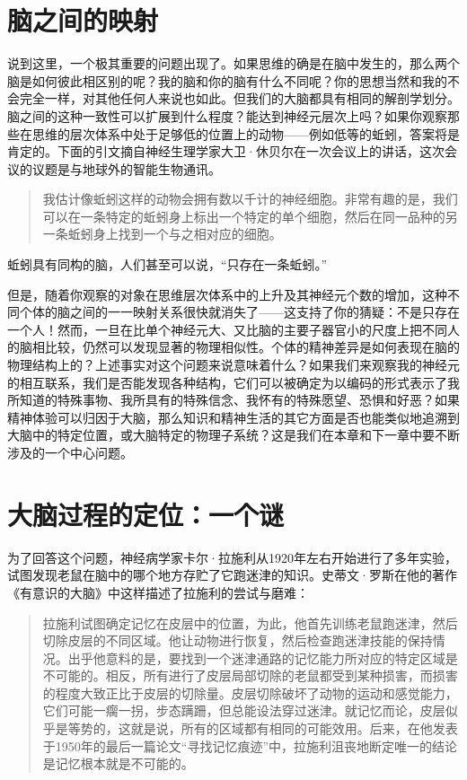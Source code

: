 \section{脑之间的映射}

说到这里，一个极其重要的问题出现了。如果思维的确是在脑中发生的，那么两个脑是如何彼此相区别的呢？我的脑和你的脑有什么不同呢？你的思想当然和我的不会完全一样，对其他任何人来说也如此。但我们的大脑都具有相同的解剖学划分。脑之间的这种一致性可以扩展到什么程度？能达到神经元层次上吗？如果你观察那些在思维的层次体系中处于足够低的位置上的动物——例如低等的蚯蚓，答案将是肯定的。下面的引文摘自神经生理学家大卫·休贝尔在一次会议上的讲话，这次会议的议题是与地球外的智能生物通讯。

\begin{quote}
我估计像蚯蚓这样的动物会拥有数以千计的神经细胞。非常有趣的是，我们可以在一条特定的蚯蚓身上标出一个特定的单个细胞，然后在同一品种的另一条蚯蚓身上找到一个与之相对应的细胞。
\end{quote}
蚯蚓具有同构的脑，人们甚至可以说，“只存在一条蚯蚓。”

但是，随着你观察的对象在思维层次体系中的上升及其神经元个数的增加，这种不同个体的脑之间的一一映射关系很快就消失了——这支持了你的猜疑：不是只存在一个人！然而，一旦在比单个神经元大、又比脑的主要子器官小的尺度上把不同人的脑相比较，仍然可以发现显著的物理相似性。个体的精神差异是如何表现在脑的物理结构上的？上述事实对这个问题来说意味着什么？如果我们来观察我的神经元的相互联系，我们是否能发现各种结构，它们可以被确定为以编码的形式表示了我所知道的特殊事物、我所具有的特殊信念、我怀有的特殊愿望、恐惧和好恶？如果精神体验可以归因于大脑，那么知识和精神生活的其它方面是否也能类似地追溯到大脑中的特定位置，或大脑特定的物理子系统？这是我们在本章和下一章中要不断涉及的一个中心问题。

\section{大脑过程的定位：一个谜}

为了回答这个问题，神经病学家卡尔·拉施利从1920年左右开始进行了多年实验，试图发现老鼠在脑中的哪个地方存贮了它跑迷津的知识。史蒂文·罗斯在他的著作《有意识的大脑》中这样描述了拉施利的尝试与磨难：

\begin{quote}
拉施利试图确定记忆在皮层中的位置，为此，他首先训练老鼠跑迷津，然后切除皮层的不同区域。他让动物进行恢复，然后检查跑迷津技能的保持情况。出乎他意料的是，要找到一个迷津通路的记忆能力所对应的特定区域是不可能的。相反，所有进行了皮层局部切除的老鼠都受到某种损害，而损害的程度大致正比于皮层的切除量。皮层切除破坏了动物的运动和感觉能力，它们可能一瘸一拐，步态蹒跚，但总能设法穿过迷津。就记忆而论，皮层似乎是等势的，这就是说，所有的区域都有相同的可能效用。后来，在他发表于1950年的最后一篇论文“寻找记忆痕迹”中，拉施利沮丧地断定唯一的结论是记忆根本就是不可能的。
\end{quote}

